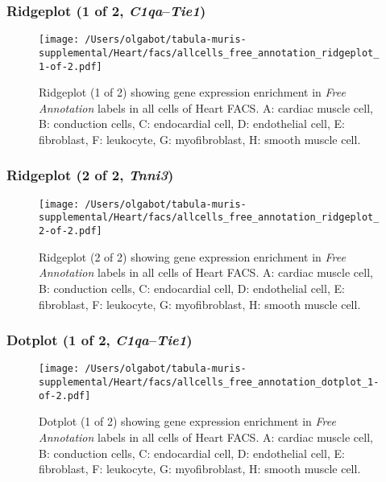 \clearpage

\subsubsection{Ridgeplot (1 of 2, \emph{C1qa}--\emph{Tie1})}
\begin{figure}[h]
\centering
\texttt{[image: /Users/olgabot/tabula-muris-supplemental/Heart/facs/allcells\_free\_annotation\_ridgeplot\_1-of-2.pdf]}

\caption{ Ridgeplot (1 of 2)  showing gene expression enrichment in \emph{Free Annotation} labels in all cells of Heart FACS. A: cardiac muscle cell, B: conduction cells, C: endocardial cell, D: endothelial cell, E: fibroblast, F: leukocyte, G: myofibroblast, H: smooth muscle cell.}
\end{figure}


\clearpage

\subsubsection{Ridgeplot (2 of 2, \emph{Tnni3})}
\begin{figure}[h]
\centering
\texttt{[image: /Users/olgabot/tabula-muris-supplemental/Heart/facs/allcells\_free\_annotation\_ridgeplot\_2-of-2.pdf]}

\caption{ Ridgeplot (2 of 2)  showing gene expression enrichment in \emph{Free Annotation} labels in all cells of Heart FACS. A: cardiac muscle cell, B: conduction cells, C: endocardial cell, D: endothelial cell, E: fibroblast, F: leukocyte, G: myofibroblast, H: smooth muscle cell.}
\end{figure}


\clearpage

\subsubsection{Dotplot (1 of 2, \emph{C1qa}--\emph{Tie1})}
\begin{figure}[h]
\centering
\texttt{[image: /Users/olgabot/tabula-muris-supplemental/Heart/facs/allcells\_free\_annotation\_dotplot\_1-of-2.pdf]}

\caption{ Dotplot (1 of 2)  showing gene expression enrichment in \emph{Free Annotation} labels in all cells of Heart FACS. A: cardiac muscle cell, B: conduction cells, C: endocardial cell, D: endothelial cell, E: fibroblast, F: leukocyte, G: myofibroblast, H: smooth muscle cell.}
\end{figure}


